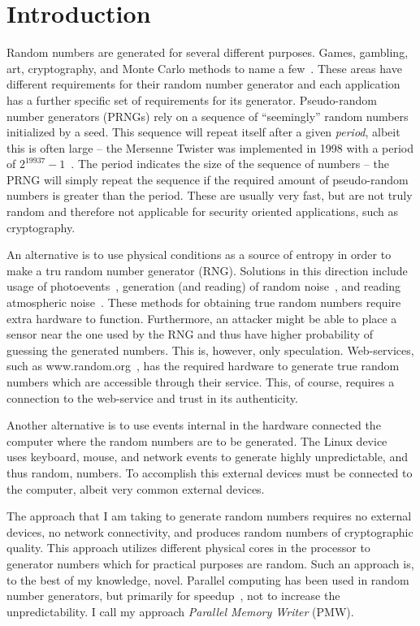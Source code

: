 \section{Introduction}
\label{sec:intro}
Random numbers are generated for several different purposes.
Games, gambling, art, cryptography, and Monte Carlo methods to name a few~\citep{Stojanovski01chaos-basedrandom}.
These areas have different requirements for their random number generator and each application has a further specific set of requirements for its generator.
Pseudo-random number generators (PRNGs) rely on a sequence of ``seemingly'' random numbers initialized by a seed.
This sequence will repeat itself after a given \emph{period}, albeit this is often large -- the Mersenne Twister was implemented in 1998 with a period of $2^{19937}-1$~\citep{Matsumoto98}.
The period indicates the size of the sequence of numbers -- the PRNG will simply repeat the sequence if the required amount of pseudo-random numbers is greater than the period.
These are usually very fast, but are not truly random and therefore not applicable for security oriented applications, such as cryptography.

An alternative is to use physical conditions as a source of entropy in order to make a tru random number generator (RNG).
Solutions in this direction include usage of photoevents~\citep{Martino91}, generation (and reading) of random noise~\citep{Holman97}, and reading atmospheric noise~\citep{random.org}.
These methods for obtaining true random numbers require extra hardware to function.
Furthermore, an attacker might be able to place a sensor near the one used by the RNG and thus have higher probability of guessing the generated numbers.
This is, however, only speculation.
Web-services, such as www.random.org~\citep{random.org}, has the required hardware to generate true random numbers which are accessible through their service.
This, of course, requires a connection to the web-service and trust in its authenticity.

Another alternative is to use events internal in the hardware connected the computer where the random numbers are to be generated.
The Linux device \devrandom{}~\citep{devrandom} uses keyboard, mouse, and network events to generate highly unpredictable, and thus random, numbers.
To accomplish this external devices must be connected to the computer, albeit very common external devices.

The approach that I am taking to generate random numbers requires no external devices, no network connectivity, and produces random numbers of cryptographic quality.
This approach utilizes different physical cores in the processor to generator numbers which for practical purposes are random.
Such an approach is, to the best of my knowledge, novel.
Parallel computing has been used in random number generators, but primarily for speedup~\citep{parallelRand}, not to increase the unpredictability.
I call my approach \emph{Parallel Memory Writer} (PMW).

